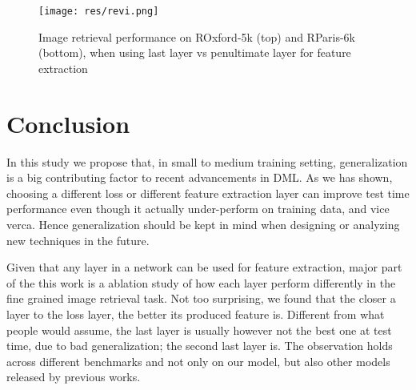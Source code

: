 \documentclass[10pt,twocolumn,letterpaper]{article}
\begin{document}
\begin{figure}
  \texttt{[image: res/revi.png]}
  \vspace{2pt}
  \caption{Image retrieval performance on ROxford-5k (top) and RParis-6k (bottom), when using last layer vs penultimate layer for feature extraction}
  \label{fig:revi}
\end{figure}


\section{Conclusion}

In this study we propose that, in small to medium training setting, generalization is a big contributing factor to recent advancements in DML. As we has shown, choosing a different loss or different feature extraction layer can improve test time performance even though it actually under-perform on training data, and vice verca. Hence generalization should be kept in mind when designing or analyzing new techniques in the future.

Given that any layer in a network can be used for feature extraction, major part of the this work is a ablation study of how each layer perform differently in the fine grained image retrieval task. Not too surprising, we found that the closer a layer to the loss layer, the better its produced feature is. Different from what people would assume, the last layer is usually however not the best one at test time, due to bad generalization; the second last layer is. The observation holds across different benchmarks and not only on our model, but also other models released by previous works.


{\small


}
\end{document}
